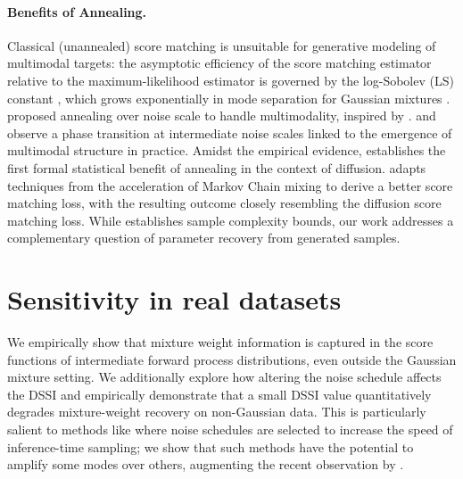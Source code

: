 \documentclass[11pt]{article}
\theoremstyle{plain}
\newcommand{\1}{\mathbbm{1}}
\begin{document}
\paragraph{Benefits of Annealing.} 
Classical (unannealed) score matching \citep{10.5555/1046920.1088696} is unsuitable for generative modeling of multimodal targets: the asymptotic efficiency of the score matching estimator relative to the maximum-likelihood estimator is governed by the log-Sobolev (LS) constant \citep{koehler2022statisticalefficiencyscorematching}, which grows exponentially in mode separation for Gaussian mixtures \citep{chen2021dimensionfreelogsobolevinequalitiesmixture}. \citet{song2019generative} proposed annealing over noise scale to handle multimodality, inspired by \citet{neal_annealed_2001}. 
\citet{biroli2024dynamical} and \citet{raya2023symmetry} observe a phase transition at intermediate noise scales linked to the emergence of multimodal structure in practice. 
Amidst the empirical evidence, \citet{qin2024fit} establishes the first formal statistical benefit of annealing in the context of diffusion. \citet{qin2024fit} adapts techniques from the acceleration of Markov Chain mixing to derive a better score matching loss, with the resulting outcome closely resembling the diffusion score matching loss. While \citet{qin2024fit} establishes sample complexity bounds, our work addresses a complementary question of parameter recovery from generated samples. %

\section{Sensitivity in real datasets}\label{sec:sensitivity-real-data}

We empirically show that mixture weight information is captured in the score functions of intermediate forward process distributions, even outside the Gaussian mixture setting. We additionally explore how altering the noise schedule affects the DSSI and empirically demonstrate that a small DSSI value quantitatively degrades mixture-weight recovery on non-Gaussian data. This is particularly salient to methods like \citep{songddim2021, lu2022dpmsolver, karras2022elucidating} where noise schedules are selected to increase the speed of inference-time sampling; we show that such methods have the potential to amplify some modes over others, augmenting the recent observation by \citet{zhang2025collapse}. 
\end{document}
